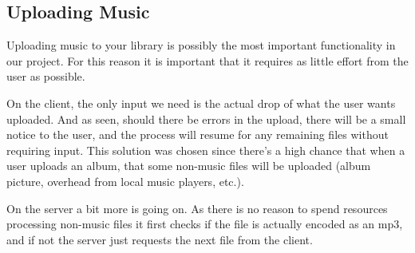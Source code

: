 \clearpage\subsection{Uploading Music}

\noindent{}

Uploading music to your library is possibly the most important functionality in our project. For this reason it is important that
it requires as little effort from the user as possible.

On the client, the only input we need is the actual drop of what the user wants uploaded. And as seen, should there be errors in the
upload, there will be a small notice to the user, and the process will resume for any remaining files without requiring input. This
solution was chosen since there's a high chance that when a user uploads an album, that some non-music files will be uploaded (album
 picture, overhead from local music players, etc.).

On the server a bit more is going on. As there is no reason to spend resources processing non-music files it first checks if the file is
actually encoded as an mp3, and if not the server just requests the next file from the client.

